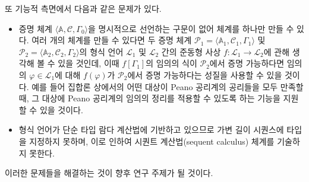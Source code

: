 \documentclass[10pt,twocolumn]{article}
\theoremstyle{definition}
\begin{document}
또 기능적 측면에서 다음과 같은 문제가 있다.

\begin{itemize}
	\item 증명 체계 $\langle\mathbb A, \mathcal C, \Gamma_0\rangle$을 명시적으로 선언하는 구문이 없어 체계를 하나만 만들 수 있다. 여러 개의 체계를 만들 수 있다면 두 증명 체계 $\mathcal P_1 = \langle\mathbb A_1, \mathcal C_1, \Gamma_1\rangle$ 및 $\mathcal P_2 = \langle\mathbb A_2, \mathcal C_2, \Gamma_2\rangle$의 형식 언어 $\mathcal L_1$ 및 $\mathcal L_2$ 간의 준동형 사상 $f: \mathcal L_1\to\mathcal L_2$에 관해 생각해 볼 수 있을 것인데, 이때 $f[\Gamma_1]$의 임의의 식이 $\mathcal P_2$에서 증명 가능하다면 임의의 $\varphi\in\mathcal L_1$에 대해 $f(\varphi)$가 $\mathcal P_2$에서 증명 가능하다는 성질을 사용할 수 있을 것이다. 예를 들어 집합론 상에서의 어떤 대상이 Peano 공리계의 공리들을 모두 만족할 때, 그 대상에 Peano 공리계의 임의의 정리를 적용할 수 있도록 하는 기능을 지원할 수 있을 것이다.
	\item 형식 언어가 단순 타입 람다 계산법에 기반하고 있으므로 가변 길이 시퀀스에 타입을 지정하지 못하며, 이로 인하여 시퀀트 계산법(sequent calculus) 체계를 기술하지 못한다.
\end{itemize}

이러한 문제들을 해결하는 것이 향후 연구 주제가 될 것이다.


\end{document}
